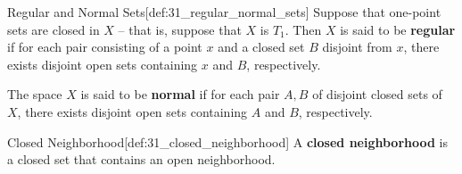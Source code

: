 \begin{defBox}{Regular and Normal Sets}[def:31_regular_normal_sets]
    Suppose that one-point sets are closed in \( X \) -- that is, suppose that
    \( X \) is \( T_{ 1 } \).
    Then \( X \) is said to be \textbf{regular} if for each pair consisting
    of a point \( x \) and a closed set \( B \) disjoint from \( x \), there
    exists disjoint open sets containing \( x \) and \( B \), respectively.

    \baseSkip

    The space \( X \) is said to be \textbf{normal} if for each pair \( A, B \)
    of disjoint closed sets of \( X \), there exists disjoint open sets 
    containing \( A \) and \( B \), respectively.
\end{defBox}

\begin{defBox}{Closed Neighborhood}[def:31_closed_neighborhood]
    A \textbf{closed neighborhood} is a closed set that contains an open 
    neighborhood.
\end{defBox}